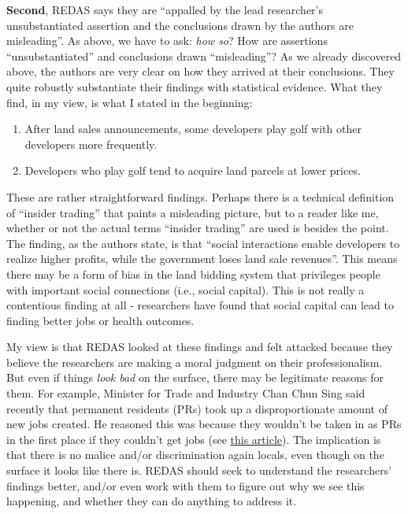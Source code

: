 \documentclass[openany]{book}
\providecommand{\tightlist}{%
  \setlength{\itemsep}{0pt}\setlength{\parskip}{0pt}}
\begin{document}
\textbf{Second}, REDAS says they are ``appalled by the lead researcher's
unsubstantiated assertion and the conclusions drawn by the authors are
misleading''. As above, we have to ask: \emph{how so}? How are
assertions ``unsubstantiated'' and conclusions drawn ``misleading''? As
we already discovered above, the authors are very clear on how they
arrived at their conclusions. They quite robustly substantiate their
findings with statistical evidence. What they find, in my view, is what
I stated in the beginning:

\begin{enumerate}
\def\labelenumi{\arabic{enumi}.}
\tightlist
\item
  After land sales announcements, some developers play golf with other
  developers more frequently.
\item
  Developers who play golf tend to acquire land parcels at lower prices.
\end{enumerate}

These are rather straightforward findings. Perhaps there is a technical
definition of ``insider trading'' that paints a misleading picture, but
to a reader like me, whether or not the actual terms ``insider trading''
are used is besides the point. The finding, as the authors state, is
that ``social interactions enable developers to realize higher profits,
while the government loses land sale revenues''. This means there may be
a form of bias in the land bidding system that privileges people with
important social connections (i.e., social capital). This is not really
a contentious finding at all - researchers have found that social
capital can lead to finding better jobs or health outcomes.

My view is that REDAS looked at these findings and felt attacked because
they believe the researchers are making a moral judgment on their
professionalism. But even if things \emph{look bad} on the surface,
there may be legitimate reasons for them. For example, Minister for
Trade and Industry Chan Chun Sing said recently that permanent residents
(PRs) took up a disproportionate amount of new jobs created. He reasoned
this was because they wouldn't be taken in as PRs in the first place if
they couldn't get jobs (see
\href{https://www.todayonline.com/singapore/prs-took-about-17-net-new-jobs-created-spore-between-2015-and-2018-chan-chun-sing}{this
article}). The implication is that there is no malice and/or
discrimination again locals, even though on the surface it looks like
there is. REDAS should seek to understand the researchers' findings
better, and/or even work with them to figure out why we see this
happening, and whether they can do anything to address it.
\end{document}
